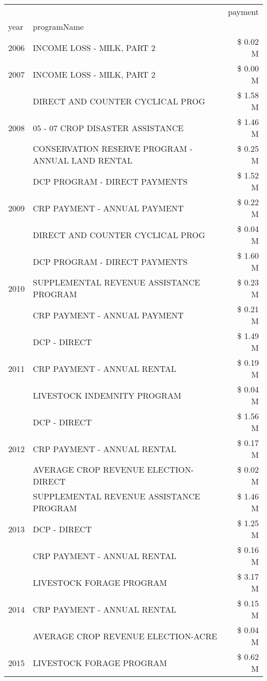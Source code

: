 \begin{tabular}{llr}
\toprule
 &  & payment \\
year & programName &  \\
\midrule
2006 & INCOME LOSS - MILK, PART 2 & \$ 0.02 M \\
\cline{1-3}
2007 & INCOME LOSS - MILK, PART 2 & \$ 0.00 M \\
\cline{1-3}
\multirow[t]{3}{*}{2008} & DIRECT AND COUNTER CYCLICAL PROG & \$ 1.58 M \\
 & 05 - 07 CROP DISASTER ASSISTANCE & \$ 1.46 M \\
 & CONSERVATION RESERVE PROGRAM - ANNUAL LAND RENTAL & \$ 0.25 M \\
\cline{1-3}
\multirow[t]{3}{*}{2009} & DCP PROGRAM - DIRECT PAYMENTS & \$ 1.52 M \\
 & CRP PAYMENT - ANNUAL PAYMENT & \$ 0.22 M \\
 & DIRECT AND COUNTER CYCLICAL PROG & \$ 0.04 M \\
\cline{1-3}
\multirow[t]{3}{*}{2010} & DCP PROGRAM - DIRECT PAYMENTS & \$ 1.60 M \\
 & SUPPLEMENTAL REVENUE ASSISTANCE PROGRAM & \$ 0.23 M \\
 & CRP PAYMENT - ANNUAL PAYMENT & \$ 0.21 M \\
\cline{1-3}
\multirow[t]{3}{*}{2011} & DCP - DIRECT & \$ 1.49 M \\
 & CRP PAYMENT - ANNUAL RENTAL & \$ 0.19 M \\
 & LIVESTOCK INDEMNITY PROGRAM & \$ 0.04 M \\
\cline{1-3}
\multirow[t]{3}{*}{2012} & DCP - DIRECT & \$ 1.56 M \\
 & CRP PAYMENT - ANNUAL RENTAL & \$ 0.17 M \\
 & AVERAGE CROP REVENUE ELECTION-DIRECT & \$ 0.02 M \\
\cline{1-3}
\multirow[t]{3}{*}{2013} & SUPPLEMENTAL REVENUE ASSISTANCE PROGRAM & \$ 1.46 M \\
 & DCP - DIRECT & \$ 1.25 M \\
 & CRP PAYMENT - ANNUAL RENTAL & \$ 0.16 M \\
\cline{1-3}
\multirow[t]{3}{*}{2014} & LIVESTOCK FORAGE PROGRAM & \$ 3.17 M \\
 & CRP PAYMENT - ANNUAL RENTAL & \$ 0.15 M \\
 & AVERAGE CROP REVENUE ELECTION-ACRE & \$ 0.04 M \\
\cline{1-3}
\multirow[t]{3}{*}{2015} & LIVESTOCK FORAGE PROGRAM & \$ 0.62 M \\

\end{tabular}
